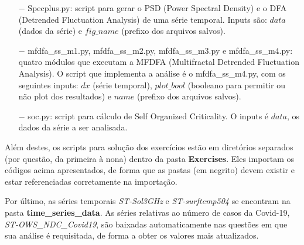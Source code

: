 \begin{itemize}
\begin{itemize}
\item[$-$] Specplus.py: script para gerar o PSD (Power Spectral Density) e o DFA (Detrended Fluctuation Analysis) de uma série temporal. Inputs são: $data$ (dados da série) e $fig\_name$ (prefixo dos arquivos salvos). 

\item[$-$] mfdfa\_ss\_m1.py, mfdfa\_ss\_m2.py, mfdfa\_ss\_m3.py e mfdfa\_ss\_m4.py: quatro módulos que executam a MFDFA (Multifractal Detrended Fluctuation Analysis). O script que implementa a análise é o mfdfa\_ss\_m4.py, com os seguintes inputs: $dx$ (série temporal), $plot\_bool$ (booleano para permitir ou não plot dos resultados) e $name$ (prefixo dos arquivos salvos). 

\item[$-$] soc.py: script para cálculo de Self Organized Criticality. O inputs é $data$, os dados da série a ser analisada.
\end{itemize}

\end{itemize}


Além destes, os scripts para solução dos exercícios estão em diretórios separados (por questão, da primeira à nona) dentro da pasta \textbf{Exercises}. Eles importam os códigos acima apresentados, de forma que as pastas (em negrito) devem existir e estar referenciadas corretamente na importação. 

Por último, as séries temporais \textit{ST-Sol3GHz} e \textit{ST-surftemp504} se encontram na pasta \textbf{time\_series\_data}. As séries relativas ao número de casos da Covid-19, \textit{ST-OWS\_NDC\_Covid19}, são baixadas automaticamente nas questões em que sua análise é requisitada, de forma a obter os valores mais atualizados.


